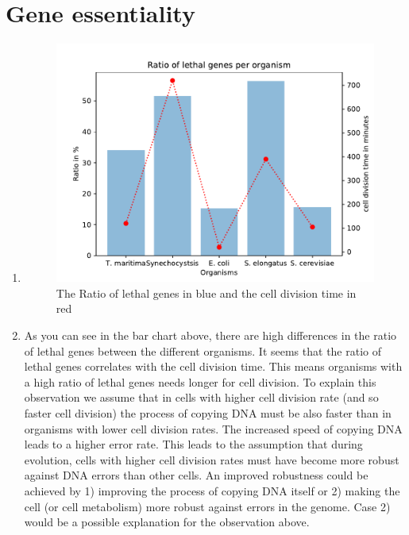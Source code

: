 \documentclass{scrartcl}
\begin{document}
\section{Gene essentiality}
\begin{enumerate}
	\item 
	\begin{figure}[H]
		\centering
		\includegraphics[max width=\linewidth]{Figure_question4.pdf}
		\caption{The Ratio of lethal genes in blue and the cell division time in red}
	\end{figure}
	\item As you can see in the bar chart above, there are high differences in the ratio of lethal genes between the different organisms. It seems that the ratio of lethal genes correlates with the cell division time. This means organisms with a high ratio of lethal genes needs longer for cell division.
		To explain this observation we assume that in cells with higher cell division rate (and so faster cell division) the process of copying DNA must be also faster than in organisms with lower cell division rates. The increased speed of copying DNA leads to a higher error rate. This leads to the assumption that during evolution, cells with higher cell division rates must have become more robust against DNA errors than other cells. An improved robustness could be achieved by 1) improving the process of copying DNA itself or 2) making the cell (or cell metabolism) more robust against errors in the genome. Case 2) would be a possible explanation for the observation above.
\end{enumerate}
\end{document}
